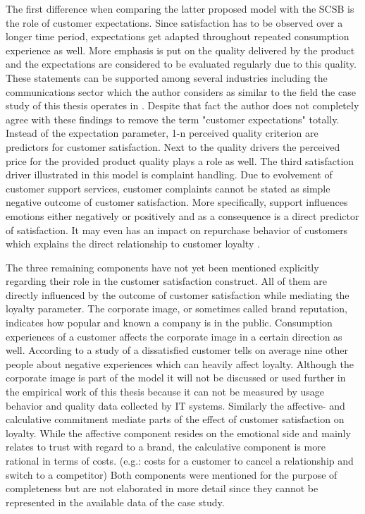 The first difference when comparing the latter proposed model with the SCSB is the role of customer expectations. Since satisfaction has to be observed over a longer time period, expectations get adapted throughout repeated consumption experience as well. More emphasis is put on the quality delivered by the product and the expectations are considered to be evaluated regularly due to this quality. These statements can be supported among several industries including the communications sector which the author considers as similar to the field the case study of this thesis operates in \cite{johnson1996expectations} \cite{fornell1996american}. Despite that fact the author does not completely agree with these findings to remove the term "customer expectations" totally. Instead of the expectation parameter, 1-n perceived quality criterion are predictors for customer satisfaction. Next to the quality drivers the perceived price for the provided product quality plays a role as well. The third satisfaction driver illustrated in this model is complaint handling. Due to evolvement of customer support services, customer complaints cannot be stated as simple negative outcome of customer satisfaction. More specifically, support influences emotions either negatively or positively and as a consequence is a direct predictor of satisfaction. It may even has an impact on repurchase behavior of customers which explains the direct relationship to customer loyalty \cite{johnson2001evolution}. 

The three remaining components have not yet been mentioned explicitly regarding their role in the customer satisfaction construct. All of them are directly influenced by the outcome of customer satisfaction while mediating the loyalty parameter. The corporate image, or sometimes called brand reputation, indicates how popular and known a company is in the public. Consumption experiences of a customer affects the corporate image in a certain direction as well. According to a study of \cite{hussain2015service} a dissatisfied customer tells on average nine other people about negative experiences which can heavily affect loyalty. Although the corporate image is part of the model it will not be discussed or used further in the empirical work of this thesis because it can not be measured by usage behavior and quality data collected by IT systems. Similarly the affective- and calculative commitment mediate parts of the effect of customer satisfaction on loyalty. While the affective component resides on the emotional side and mainly relates to trust with regard to a brand, the calculative component is more rational in terms of costs. (e.g.: costs for a customer to cancel a relationship and switch to a competitor) \cite{johnson2001evolution} Both components were mentioned for the purpose of completeness but are not elaborated in more detail since they cannot be represented in the available data of the case study. 

